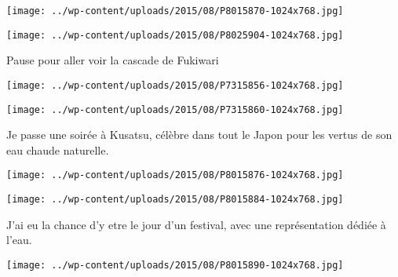  

 

\begin{center} \texttt{[image: ../wp-content/uploads/2015/08/P8015870-1024x768.jpg]} \end{center}

 

 

\begin{center} \texttt{[image: ../wp-content/uploads/2015/08/P8025904-1024x768.jpg]} \end{center}

 

 Pause pour aller voir la cascade de Fukiwari 

 

\begin{center} \texttt{[image: ../wp-content/uploads/2015/08/P7315856-1024x768.jpg]} \end{center}

 

 

\begin{center} \texttt{[image: ../wp-content/uploads/2015/08/P7315860-1024x768.jpg]} \end{center}

 

 Je passe une soirée à Kusatsu, célèbre dans tout le Japon pour les vertus de son eau chaude naturelle. 

 

\begin{center} \texttt{[image: ../wp-content/uploads/2015/08/P8015876-1024x768.jpg]} \end{center}

 

 

\begin{center} \texttt{[image: ../wp-content/uploads/2015/08/P8015884-1024x768.jpg]} \end{center}

 

 J'ai eu la chance d'y etre le jour d'un festival, avec une représentation dédiée à l'eau. 

 

\begin{center} \texttt{[image: ../wp-content/uploads/2015/08/P8015890-1024x768.jpg]} \end{center}

